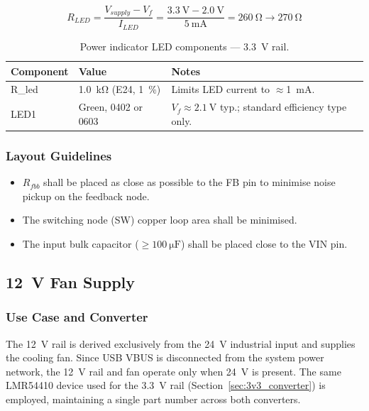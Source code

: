 \begin{equation}
  R_{LED} = \frac{V_{supply} - V_f}{I_{LED}}
          = \frac{\SI{3.3}{\volt} - \SI{2.0}{\volt}}{\SI{5}{\milli\ampere}}
          = \SI{260}{\ohm} \rightarrow \SI{270}{\ohm}
  \label{eq:rled_3v3}
\end{equation}

\begin{table}[H]
  \caption{Power indicator \ac{LED} components — \SI{3.3}{\volt} rail.}
  \label{tab:led_3v3}
  \centering
  \begin{tabularx}{\textwidth}{|X|X|X|}
    \hline
    \textbf{Component} & \textbf{Value} & \textbf{Notes} \\ \hline \hline
    R\_led & \SI{1.0}{\kilo\ohm} (E24, \SI{1}{\percent}) & Limits \ac{LED} current to $\approx$\SI{1}{\milli\ampere}. \\ \hline
    LED1   & Green, 0402 or 0603 & $V_f \approx \SI{2.1}{\volt}$ typ.; standard efficiency type only. \\ \hline
  \end{tabularx}
\end{table}

\subsubsection{Layout Guidelines}
\label{sec:layout_notes}

\begin{itemize}
  \item $R_{fbb}$ shall be placed as close as possible to the FB pin to minimise noise pickup on the feedback node.
  \item The switching node (SW) copper loop area shall be minimised.
  \item The input bulk capacitor ($\geq \SI{100}{\micro\farad}$) shall be placed close to the VIN pin.
\end{itemize}

\subsection{\SI{12}{\volt} Fan Supply}
\label{sec:12v_rail}

\subsubsection{Use Case and Converter}
\label{sec:12v_converter}

The \SI{12}{\volt} rail is derived exclusively from the \SI{24}{\volt} industrial input and supplies the cooling fan.
Since \ac{USB} VBUS is disconnected from the system power network, the \SI{12}{\volt} rail and fan operate only when \SI{24}{\volt} is present.
The same LMR54410 device used for the \SI{3.3}{\volt} rail (Section~\ref{sec:3v3_converter}) is employed, maintaining a single part number across both converters.

